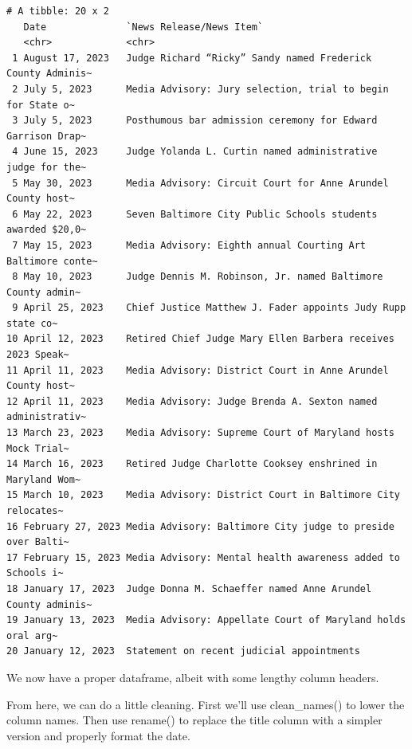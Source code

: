 \documentclass[
  letterpaper,
  DIV=11,
  numbers=noendperiod]{scrreprt}
\begin{document}
\begin{verbatim}
# A tibble: 20 x 2
   Date              `News Release/News Item`                                   
   <chr>             <chr>                                                      
 1 August 17, 2023   Judge Richard “Ricky” Sandy named Frederick County Adminis~
 2 July 5, 2023      Media Advisory: Jury selection, trial to begin for State o~
 3 July 5, 2023      Posthumous bar admission ceremony for Edward Garrison Drap~
 4 June 15, 2023     Judge Yolanda L. Curtin named administrative judge for the~
 5 May 30, 2023      Media Advisory: Circuit Court for Anne Arundel County host~
 6 May 22, 2023      Seven Baltimore City Public Schools students awarded $20,0~
 7 May 15, 2023      Media Advisory: Eighth annual Courting Art Baltimore conte~
 8 May 10, 2023      Judge Dennis M. Robinson, Jr. named Baltimore County admin~
 9 April 25, 2023    Chief Justice Matthew J. Fader appoints Judy Rupp state co~
10 April 12, 2023    Retired Chief Judge Mary Ellen Barbera receives 2023 Speak~
11 April 11, 2023    Media Advisory: District Court in Anne Arundel County host~
12 April 11, 2023    Media Advisory: Judge Brenda A. Sexton named administrativ~
13 March 23, 2023    Media Advisory: Supreme Court of Maryland hosts Mock Trial~
14 March 16, 2023    Retired Judge Charlotte Cooksey enshrined in  Maryland Wom~
15 March 10, 2023    Media Advisory: District Court in Baltimore City relocates~
16 February 27, 2023 Media Advisory: Baltimore City judge to preside over Balti~
17 February 15, 2023 Media Advisory: Mental health awareness added to Schools i~
18 January 17, 2023  Judge Donna M. Schaeffer named Anne Arundel County adminis~
19 January 13, 2023  Media Advisory: Appellate Court of Maryland holds oral arg~
20 January 12, 2023  Statement on recent judicial appointments                  
\end{verbatim}

We now have a proper dataframe, albeit with some lengthy column headers.

From here, we can do a little cleaning. First we'll use clean\_names()
to lower the column names. Then use rename() to replace the title column
with a simpler version and properly format the date.
\end{document}
